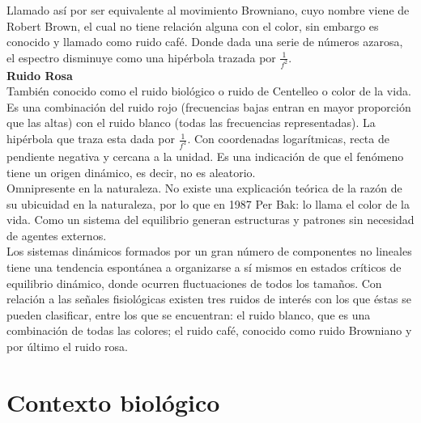 \documentclass[letterpaper,titlepage,12pt,draft]{report}
\begin{document}
Llamado as\'i por ser equivalente al movimiento Browniano, cuyo nombre viene de Robert Brown, el cual no tiene relaci\'on alguna con el color, sin embargo es conocido y llamado como ruido caf\'e. Donde dada una serie de n\'umeros azarosa, el espectro disminuye como una hip\'erbola trazada por $\frac{1}{f^2}$. \\

%

{\bf Ruido Rosa}\\

Tambi\'en conocido como el ruido biol\'ogico o ruido de Centelleo o color de la vida. Es una combinaci\'on del ruido rojo (frecuencias bajas entran en mayor proporci\'on que las altas) con el ruido blanco (todas las frecuencias representadas). La hip\'erbola que traza esta dada por $\frac{1}{f^1}$. Con coordenadas logar\'itmicas, recta de pendiente negativa y cercana a la unidad. Es una indicaci\'on de que el fen\'omeno tiene un origen din\'amico, es decir, no es aleatorio.\\

Omnipresente en la naturaleza. No existe una explicaci\'on te\'orica de la raz\'on de su ubicuidad en la naturaleza, por lo que en 1987 Per Bak: lo llama el color de la vida. Como un sistema del equilibrio generan estructuras y patrones sin necesidad de agentes externos.\\

Los sistemas din\'amicos formados por un gran n\'umero de componentes no lineales tiene una tendencia espont\'anea a organizarse a s\'i mismos en estados cr\'iticos de equilibrio din\'amico, donde ocurren fluctuaciones de todos los tama\~nos. Con relaci\'on a las se\~nales fisiol\'ogicas existen tres ruidos de inter\'es con los que \'estas se pueden clasificar, entre los que se encuentran: el ruido blanco, que es una combinaci\'on de todas las colores; el ruido caf\'e, conocido como ruido Browniano y por \'ultimo el ruido rosa. 

\chapter{Contexto biol\'ogico}
\end{document}
